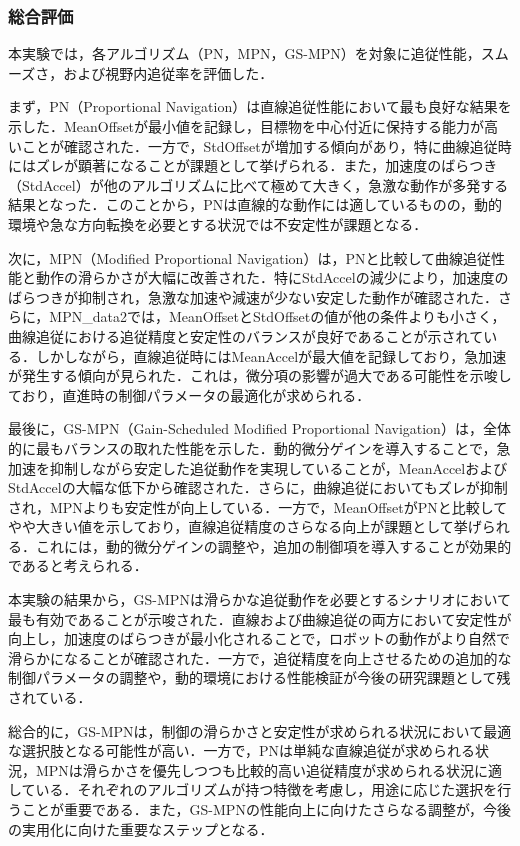 \subsubsection{総合評価}
本実験では，各アルゴリズム（PN，MPN，GS-MPN）を対象に追従性能，スムーズさ，および視野内追従率を評価した．

まず，PN（Proportional Navigation）は直線追従性能において最も良好な結果を示した．MeanOffsetが最小値を記録し，目標物を中心付近に保持する能力が高いことが確認された．一方で，StdOffsetが増加する傾向があり，特に曲線追従時にはズレが顕著になることが課題として挙げられる．また，加速度のばらつき（StdAccel）が他のアルゴリズムに比べて極めて大きく，急激な動作が多発する結果となった．このことから，PNは直線的な動作には適しているものの，動的環境や急な方向転換を必要とする状況では不安定性が課題となる．

次に，MPN（Modified Proportional Navigation）は，PNと比較して曲線追従性能と動作の滑らかさが大幅に改善された．特にStdAccelの減少により，加速度のばらつきが抑制され，急激な加速や減速が少ない安定した動作が確認された．さらに，MPN\_data2では，MeanOffsetとStdOffsetの値が他の条件よりも小さく，曲線追従における追従精度と安定性のバランスが良好であることが示されている．しかしながら，直線追従時にはMeanAccelが最大値を記録しており，急加速が発生する傾向が見られた．これは，微分項の影響が過大である可能性を示唆しており，直進時の制御パラメータの最適化が求められる．

最後に，GS-MPN（Gain-Scheduled Modified Proportional Navigation）は，全体的に最もバランスの取れた性能を示した．動的微分ゲインを導入することで，急加速を抑制しながら安定した追従動作を実現していることが，MeanAccelおよびStdAccelの大幅な低下から確認された．さらに，曲線追従においてもズレが抑制され，MPNよりも安定性が向上している．一方で，MeanOffsetがPNと比較してやや大きい値を示しており，直線追従精度のさらなる向上が課題として挙げられる．これには，動的微分ゲインの調整や，追加の制御項を導入することが効果的であると考えられる．

本実験の結果から，GS-MPNは滑らかな追従動作を必要とするシナリオにおいて最も有効であることが示唆された．直線および曲線追従の両方において安定性が向上し，加速度のばらつきが最小化されることで，ロボットの動作がより自然で滑らかになることが確認された．一方で，追従精度を向上させるための追加的な制御パラメータの調整や，動的環境における性能検証が今後の研究課題として残されている．

総合的に，GS-MPNは，制御の滑らかさと安定性が求められる状況において最適な選択肢となる可能性が高い．一方で，PNは単純な直線追従が求められる状況，MPNは滑らかさを優先しつつも比較的高い追従精度が求められる状況に適している．それぞれのアルゴリズムが持つ特徴を考慮し，用途に応じた選択を行うことが重要である．また，GS-MPNの性能向上に向けたさらなる調整が，今後の実用化に向けた重要なステップとなる．
